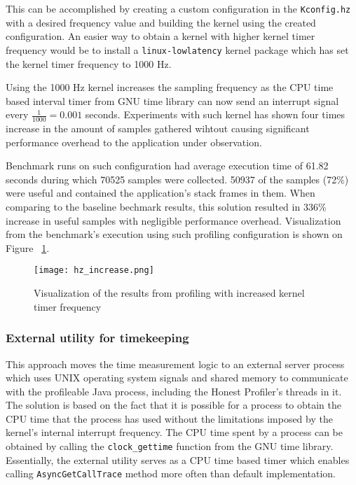 \documentclass[..thesis.tex]{subfiles}
\begin{document}
This can be accomplished by creating a custom configuration in the \texttt{Kconfig.hz} with a desired frequency value and building the kernel using the created configuration. An easier way to obtain a kernel with higher kernel timer frequency would be to install a \texttt{linux-lowlatency} kernel package which has set the kernel timer frequency to 1000 Hz.

Using the 1000 Hz kernel increases the sampling frequency as the CPU time based interval timer from GNU time library can now send an interrupt signal every $\frac{1}{1000} = 0.001$ seconds. Experiments with such kernel has shown four times increase in the amount of samples gathered wihtout causing significant performance overhead to the application under observation.

Benchmark runs on such configuration had average execution time of 61.82 seconds during which 70525 samples were collected. 50937 of the samples (72\%) were useful and contained the application's stack frames in them. When comparing to the baseline bechmark results, this solution resulted in 336\% increase in useful samples with negligible performance overhead. Visualization from the benchmark's execution using such profiling configuration is shown on Figure ~\ref{fig:hz_increase}.
\begin{figure}[H]
\texttt{[image: hz\_increase.png]}
\caption{Visualization of the results from profiling with increased kernel timer frequency}
\label{fig:hz_increase}
\end{figure}

\subsubsection{External utility for timekeeping}
\label{shared-mem}

This approach moves the time measurement logic to an external server process which uses UNIX operating system signals and shared memory to communicate with the profileable Java process, including the Honest Profiler's threads in it. The solution is based on the fact that it is possible for a process to obtain the CPU time that the process has used without the limitations imposed by the kernel's internal interrupt frequency. The CPU time spent by a process can be obtained by calling the \texttt{clock\_\-gettime} function from the GNU time library. Essentially, the external utility serves as a CPU time based timer which enables calling \texttt{Async\-Get\-Call\-Trace} method more often than default implementation.
\end{document}
